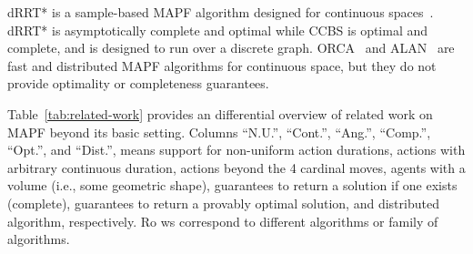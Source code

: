 \documentclass[review]{elsarticle}
\newcommand\roni[1]{\nb{\textbf{Roni:}}{green}{#1}}
\newcommand{\ccbs}{\ac{CCBS}\xspace}
\newcommand{\shortcite}{\cite}
\begin{document}
dRRT* is a sample-based \ac{MAPF} algorithm designed for continuous spaces~\cite{dobson2017scalable}. dRRT* is asymptotically complete and optimal while \ccbs is optimal and complete, and is designed to run over a discrete graph. ORCA~\cite{van2005prioritized,snape2011hybrid} 
and ALAN~\cite{godoy2018alan} are fast and distributed \ac{MAPF} algorithms for continuous space, but they do not provide optimality or completeness guarantees. 






Table~\ref{tab:related-work} provides an differential overview of related work on \ac{MAPF} beyond its basic setting. 
Columns ``N.U.'',  ``Cont.'', ``Ang.'', ``Comp.'', ``Opt.'', and ``Dist.'', means support for non-uniform action durations, 
actions with arbitrary continuous duration, 
actions beyond the 4 cardinal moves, 
agents with a volume (i.e., some geometric shape), 
guarantees to return a solution if one exists (complete),
guarantees to return a provably optimal solution, 
and distributed algorithm, respectively. Ro
ws correspond to  different algorithms or family of algorithms. %








\end{document}
